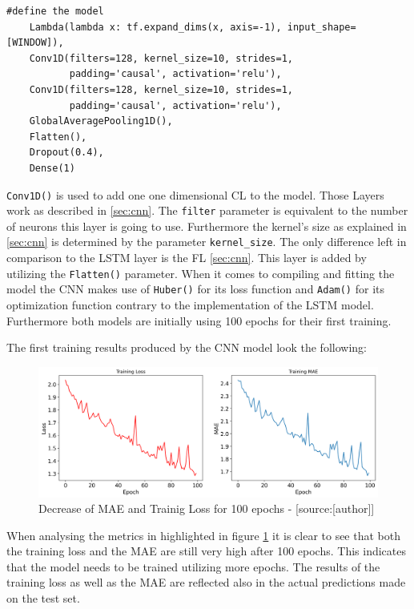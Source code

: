  \begin{lstlisting}
#define the model 
    Lambda(lambda x: tf.expand_dims(x, axis=-1), input_shape=[WINDOW]),
    Conv1D(filters=128, kernel_size=10, strides=1,
           padding='causal', activation='relu'),
    Conv1D(filters=128, kernel_size=10, strides=1,
           padding='causal', activation='relu'),
    GlobalAveragePooling1D(),
    Flatten(),
    Dropout(0.4),
    Dense(1)
\end{lstlisting}
\verb|Conv1D()| is used to add one one dimensional CL to the model. Those Layers work as described in \ref{sec:cnn}.  The \verb|filter| parameter is equivalent to the number of neurons this layer is going to use. Furthermore the kernel's size as explained in \ref{sec:cnn} is determined by the parameter \verb|kernel_size|.
The only difference left in comparison to the LSTM layer is the FL \ref{sec:cnn}. This layer is added by utilizing the \verb|Flatten()| parameter. When it comes to compiling and fitting the model the CNN makes use of  \verb|Huber()| for its loss function and \verb|Adam()| for its optimization function contrary to the implementation of the LSTM model. Furthermore both models are initially using 100 epochs for their first training. \newline

The first training results produced by the CNN model look the following: 

\begin{figure}[H]
	\centering
		\includegraphics[width=14cm]{images/cnn_model_1_loss}
	\caption{Decrease of MAE and Trainig Loss for 100 epochs - [source:[author]]}
	\label{fig:training_test_cnn}
\end{figure}
When analysing the metrics in highlighted in figure \ref{fig:training_test_cnn} it is clear to see that both the training loss and the MAE are still very high after 100 epochs. This indicates that the model needs to be trained utilizing more epochs. The results of the training loss as well as the MAE are reflected also in the actual predictions made on the test set.

